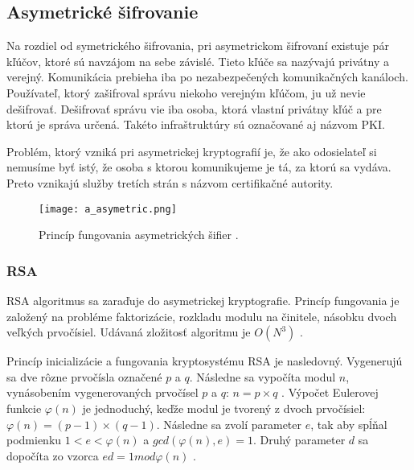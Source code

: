 \documentclass[12pt,a4paper,oneside,openright]{report}
\begin{document}

\subsection{Asymetrické šifrovanie}  \label{s_cpyt_asymetric}
Na rozdiel od symetrického šifrovania, pri asymetrickom šifrovaní existuje pár kľúčov, ktoré sú navzájom na sebe závislé. Tieto kľúče sa nazývajú privátny a verejný. Komunikácia prebieha iba po nezabezpečených komunikačných kanáloch. Používateľ, ktorý zašifroval správu niekoho verejným kľúčom, ju už nevie dešifrovať. Dešifrovať správu vie iba osoba, ktorá vlastní privátny kľúč a pre ktorú je správa určená.  Takéto infraštruktúry sú označované aj názvom PKI.

Problém, ktorý vzniká pri asymetrickej kryptografií je, že ako odosielateľ si nemusíme byť istý, že osoba s ktorou komunikujeme je tá, za ktorú sa vydáva. Preto vznikajú služby tretích strán s názvom certifikačné autority.

\begin{figure*}[!htb]
	\centering
	\texttt{[image: a\_asymetric.png]}
	\caption{Princíp fungovania asymetrických šifier \cite{cryptographyhandbook}.}
	\label{f:o_asymetric}
\end{figure*}

\subsubsection{RSA}
RSA algoritmus sa zaraďuje do asymetrickej kryptografie. Princíp fungovania je založený na probléme faktorizácie, rozkladu modulu na činitele, násobku dvoch veľkých prvočísiel. Udávaná zložitosť algoritmu je $O(N^3)$ \cite{rsalesson}.

Princíp inicializácie a fungovania kryptosystému RSA je nasledovný. Vygenerujú sa dve rôzne prvočísla označené $p$ a $q$. Následne sa vypočíta modul $n$, vynásobením vygenerovaných prvočísel $p$ a $q$: $n= p \times q $ \cite{rsalesson}.
Výpočet Eulerovej funkcie $\varphi(n)$ je jednoduchý, keďže modul je tvorený z dvoch prvočísiel: $\varphi(n)=(p-1)\times(q-1)$. Následne sa zvolí parameter $e$, tak aby spĺňal podmienku $1<e<\varphi(n)$ a $gcd(\varphi(n),e)=1$. Druhý parameter $d$ sa dopočíta zo vzorca $ed=1 mod \varphi(n)$ \cite{rsalesson}.
\end{document}
